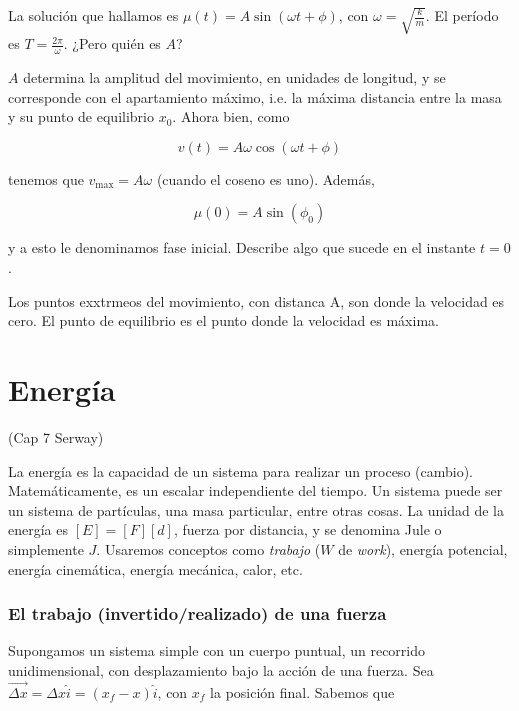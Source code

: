 \documentclass[12pt]{article}
\theoremstyle{definition}
\begin{document}
La solución que hallamos es $\mu(t) = A \sin(\omega t + \phi)$, con $\omega =
\sqrt{\frac{k}{m}} $. El período es $T = \frac{2\pi}{\omega}$. ¿Pero quién es
$A$?  

$A$ determina la amplitud del movimiento, en unidades de longitud, y se
corresponde con el apartamiento máximo, i.e. la máxima distancia entre la masa y
su punto de equilibrio $x_0$.  Ahora bien, como 

\begin{equation*}
    v(t) = A \omega \cos(\omega t + \phi)
\end{equation*}

tenemos que $v_{\max} = A \omega$ (cuando el coseno es uno). Además, 

\begin{equation*}
    \mu(0) = A \sin(\phi_0)
\end{equation*}

y a esto le denominamos fase inicial. Describe algo que sucede en el instante $t
= 0$.

Los puntos exxtrmeos del movimiento, con distanca A, son donde la velocidad es
cero. El punto de equilibrio es el punto donde la velocidad es máxima.   

\section{Energía}

(Cap 7 Serway)

La energía es la capacidad de un sistema para realizar un proceso (cambio).
Matemáticamente, es un escalar independiente del tiempo. Un sistema puede ser un
sistema de partículas, una masa particular, entre otras cosas. La unidad de la
energía es $\left[ E \right] = \left[ F \right]\left[ d \right]    $, fuerza por
distancia, y se denomina Jule o simplemente $J$. Usaremos conceptos como
\textit{trabajo} ($W$ de \textit{work}), energía potencial, energía cinemática,
energía mecánica, calor, etc.

\subsubsection{El trabajo (invertido/realizado) de una fuerza}

Supongamos un sistema simple con un cuerpo puntual, un recorrido unidimensional,
con desplazamiento bajo la acción de una fuerza. Sea $\vec{\Delta x} = \Delta x
\hat{i} = (x_f - x)\hat{i}$, con $x_f$ la posición final. Sabemos que 
\end{document}
